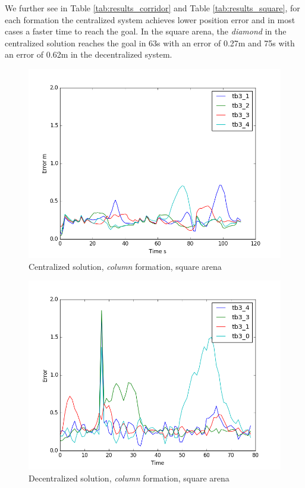 \documentclass[letterpaper, 10 pt, conference]{ieeeconf}  %
\begin{document}
We further see in Table \ref{tab:results_corridor} and Table \ref{tab:results_square}, for each formation the centralized system achieves lower position error and in most cases a faster time to reach the goal. In the square arena, the \textit{diamond} in the centralized solution reaches the goal in 63s with an error of 0.27m and 75s with an error of 0.62m in the decentralized system.

\begin{figure}[tb]
\centering
\includegraphics[height=0.6\linewidth]{images/centralized_plot.png}
\caption{Centralized solution, \textit{column} formation, square arena}
\label{fig:centralized}
\end{figure}

\begin{figure}[tb]
\centering
\includegraphics[height=0.6\linewidth]{images/decentalized_plot.png}
\caption{Decentralized solution, \textit{column} formation, square arena}
\label{fig:decentralized}
\end{figure}
\end{document}
